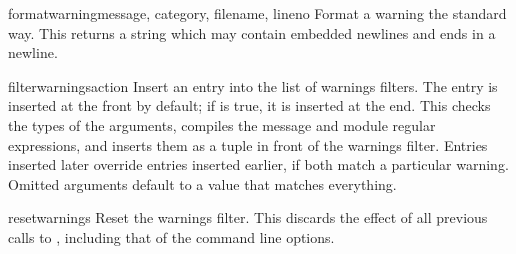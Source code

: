 \begin{funcdesc}{formatwarning}{message, category, filename, lineno}
Format a warning the standard way.  This returns a string  which may
contain embedded newlines and ends in a newline.
\end{funcdesc}

\begin{funcdesc}{filterwarnings}{action}
Insert an entry into the list of warnings filters.  The entry is
inserted at the front by default; if  is true, it is
inserted at the end.
This checks the types of the arguments, compiles the message and
module regular expressions, and inserts them as a tuple in front
of the warnings filter.  Entries inserted later override entries
inserted earlier, if both match a particular warning.  Omitted
arguments default to a value that matches everything.
\end{funcdesc}

\begin{funcdesc}{resetwarnings}{}
Reset the warnings filter.  This discards the effect of all previous
calls to , including that of the
 command line options.
\end{funcdesc}
